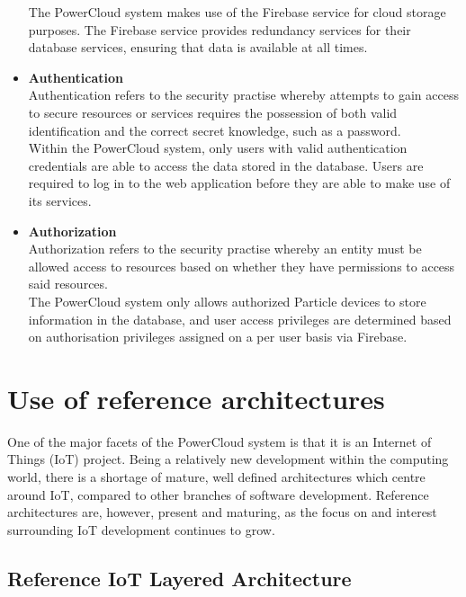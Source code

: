 \documentclass{article}
\begin{document}
\begin{itemize}
		The PowerCloud system makes use of the Firebase service for cloud 
		storage purposes. The Firebase service provides redundancy services for 
		their database services, ensuring that data is available at all times.

		\item \textbf{Authentication}\\
		Authentication refers to the security practise whereby attempts to gain 
		access to secure resources or services requires the possession of both 
		valid identification and the correct secret knowledge, such as a 
		password.\\
		
		Within the PowerCloud system, only users with valid authentication 
		credentials are able to access the data stored in the database. Users 
		are required to log in to the web application before they are able to 
		make use of its services.
		
		\item \textbf{Authorization}\\
		Authorization refers to the security practise whereby an entity must be 
		allowed access to resources based on whether they have permissions to 
		access said resources.\\
		
		The PowerCloud system only allows authorized Particle devices to store 
		information in the database, and user access privileges are determined 
		based on authorisation privileges assigned on a per user basis via 
		Firebase.
	\end{itemize}

\newpage

\section{Use of reference architectures}

	One of the major facets of the PowerCloud system is that it is an 
	Internet of Things (IoT) project. Being a relatively new development 
	within the computing world, there is a shortage of mature, well 
	defined architectures which centre around IoT, compared to other 
	branches of software development. Reference architectures are, 
	however, present and maturing, as the focus on and interest 
	surrounding IoT development continues to grow.
	
	\subsection{Reference IoT Layered Architecture}
	
\end{document}
